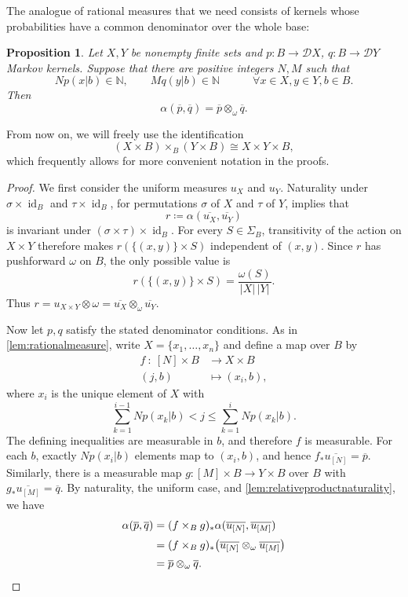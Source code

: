 \documentclass[11pt,a4paper]{scrartcl}
\newcommand{\N}{\mathbb{N}}
\newcommand{\id}{\operatorname{id}}
\newcommand{\finiteset}[1]{[#1]}	%
\newcommand{\dist}{\mathcal{D}}
\newtheorem{prop}[theo]{Proposition}
\theoremstyle{definition}
\begin{document}
The analogue of rational measures that we need consists of kernels whose probabilities have a common denominator over the whole base:

\begin{prop}\label{prop:relative_rationalcase}
	Let $X,Y$ be nonempty finite sets and $p : B \to \dist X$, $q : B \to \dist Y$ Markov kernels.
	Suppose that there are positive integers $N,M$ such that
	\[
		Np(x|b) \in \N, \qquad Mq(y|b) \in \N
		\qquad\quad
		\forall x \in X, y \in Y, b \in B.
	\]
	Then
	\[
		\alpha(\overline{p},\overline{q}) = \overline{p} \otimes_\omega \overline{q}.
	\]
\end{prop}

From now on, we will freely use the identification
\[
	(X \times B) \times_B (Y \times B) \cong X \times Y \times B,
\]
which frequently allows for more convenient notation in the proofs.

\begin{proof}
	We first consider the uniform measures $u_X$ and $u_Y$.
	Naturality under $\sigma \times \id_B$ and $\tau \times \id_B$, for permutations $\sigma$ of $X$ and $\tau$ of $Y$, implies that
	\[
		r \coloneq \alpha(\overline{u_X},\overline{u_Y})
	\]
	is invariant under $(\sigma \times \tau) \times \id_B$.
	For every $S \in \Sigma_B$, transitivity of the action on $X \times Y$ therefore makes $r(\{(x,y)\} \times S)$ independent of $(x,y)$.
	Since $r$ has pushforward $\omega$ on $B$,
	the only possible value is
	\[
		r(\{(x,y)\} \times S) = \frac{\omega(S)}{|X|\,|Y|}.
	\]
	Thus $r = u_{X \times Y} \otimes \omega = \overline{u_X} \otimes_\omega \overline{u_Y}$.

	Now let $p,q$ satisfy the stated denominator conditions.
	As in \cref{lem:rationalmeasure}, write $X = \{x_1,\ldots,x_n\}$ and define a map over $B$ by
	\begin{align*}
		f \: : \: \finiteset{N} \times B & \longrightarrow X \times B \\
		(j,b) & \longmapsto (x_i,b),
	\end{align*}
	where $x_i$ is the unique element of $X$ with
	\[
		\sum_{k=1}^{i-1} Np(x_k|b) < j \leq \sum_{k=1}^{i} Np(x_k|b).
	\]
	The defining inequalities are measurable in $b$, and therefore $f$ is measurable.
	For each $b$, exactly $Np(x_i|b)$ elements map to $(x_i,b)$, and hence $f_\ast\overline{u_{\finiteset{N}}} = \overline{p}$.
	Similarly, there is a measurable map $g : \finiteset{M} \times B \to Y \times B$ over $B$ with $g_\ast\overline{u_{\finiteset{M}}} = \overline{q}$.
	By naturality, the uniform case, and \cref{lem:relativeproductnaturality},
	we have
	\begin{align*}
		\alpha(\overline{p},\overline{q})
		&= (f \times_B g)_\ast
		\alpha
		(\overline{u_{\finiteset{N}}},\overline{u_{\finiteset{M}}}) \\[2pt]
		&= (f \times_B g)_\ast
		\bigl(\overline{u_{\finiteset{N}}} \otimes_\omega \overline{u_{\finiteset{M}}}\bigr) \\[2pt]
		&= \overline{p} \otimes_\omega \overline{q}.
		\qedhere
	\end{align*}
\end{proof}
\end{document}
